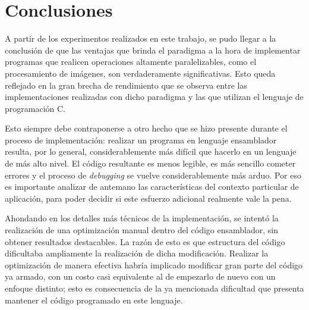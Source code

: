 \section{Conclusiones}
    A partir de los experimentos realizados en este trabajo, se pudo llegar a la conclusión de que las ventajas que brinda el paradigma  a la hora de implementar programas que realicen operaciones altamente paralelizables, como el procesamiento de imágenes, son verdaderamente significativas. Esto queda reflejado en la gran brecha de rendimiento que se observa entre las implementaciones realizadas con dicho paradigma y las que utilizan el lenguaje de programación C.

    Esto siempre debe contraponerse a otro hecho que se hizo presente durante el proceso de implementación: realizar un programa en lenguaje ensamblador resulta, por lo general, considerablemente más difícil que hacerlo en un lenguaje de más alto nivel. El código resultante es menos legible, es más sencillo cometer errores y el proceso de \emph{debugging} se vuelve considerablemente más arduo. Por eso es importante analizar de antemano las características del contexto particular de aplicación, para poder decidir si este esfuerzo adicional realmente vale la pena.

    Ahondando en los detalles más técnicos de la implementación, se intentó la realización de una optimización manual dentro del código ensamblador, sin obtener resultados destacables. La razón de esto es que estructura del código dificultaba ampliamente la realización de dicha modificación. Realizar la optimización de manera efectiva habría implicado modificar gran parte del código ya armado, con un costo casi equivalente al de empezarlo de nuevo con un enfoque distinto; esto es consecuencia de la ya mencionada dificultad que presenta mantener el código programado en este lenguaje.
